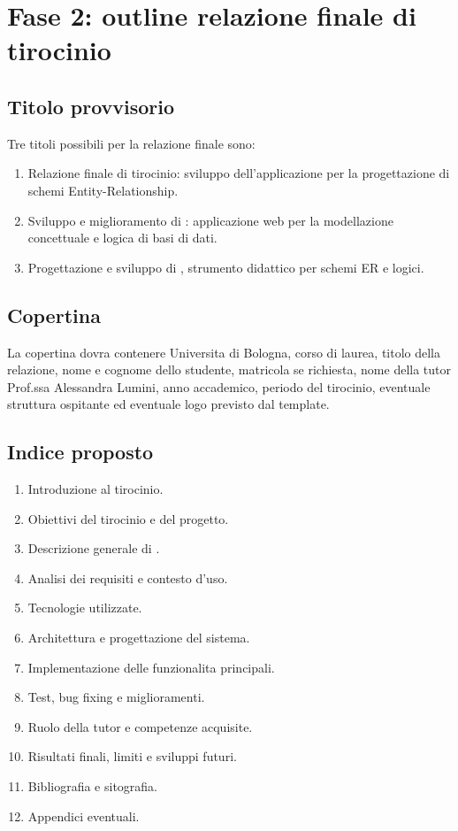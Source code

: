 
\chapter{Fase 2: outline relazione finale di tirocinio}

\section{Titolo provvisorio}

Tre titoli possibili per la relazione finale sono:

\begin{enumerate}
    \item Relazione finale di tirocinio: sviluppo dell'applicazione \builder{} per la progettazione di schemi Entity-Relationship.
    \item Sviluppo e miglioramento di \builder: applicazione web per la modellazione concettuale e logica di basi di dati.
    \item Progettazione e sviluppo di \builder, strumento didattico per schemi ER e logici.
\end{enumerate}

\section{Copertina}

La copertina dovra contenere Universita di Bologna, corso di laurea, titolo della relazione, nome e cognome dello studente, matricola se richiesta, nome della tutor Prof.ssa Alessandra Lumini, anno accademico, periodo del tirocinio, eventuale struttura ospitante ed eventuale logo previsto dal template.

\section{Indice proposto}

\begin{enumerate}
    \item Introduzione al tirocinio.
    \item Obiettivi del tirocinio e del progetto.
    \item Descrizione generale di \builder.
    \item Analisi dei requisiti e contesto d'uso.
    \item Tecnologie utilizzate.
    \item Architettura e progettazione del sistema.
    \item Implementazione delle funzionalita principali.
    \item Test, bug fixing e miglioramenti.
    \item Ruolo della tutor e competenze acquisite.
    \item Risultati finali, limiti e sviluppi futuri.
    \item Bibliografia e sitografia.
    \item Appendici eventuali.
\end{enumerate}

